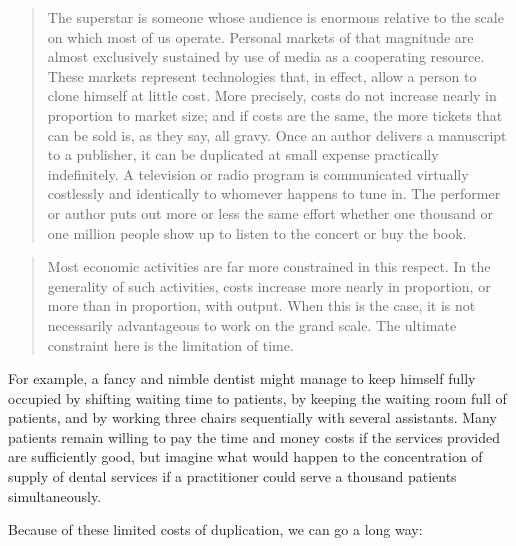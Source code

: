 \documentclass[]{book}
\theoremstyle{definition}
\theoremstyle{definition}
\theoremstyle{definition}
\theoremstyle{remark}
\begin{document}
\begin{quote}
The superstar is someone whose audience is enormous relative to the
scale on which most of us operate. Personal markets of that magnitude
are almost exclusively sustained by use of media as a cooperating
resource. These markets represent technologies that, in effect, allow a
person to clone himself at little cost. More precisely, costs do not
increase nearly in proportion to market size; and if costs are the same,
the more tickets that can be sold is, as they say, all gravy. Once an
author delivers a manuscript to a publisher, it can be duplicated at
small expense practically indefinitely. A television or radio program is
communicated virtually costlessly and identically to whomever happens to
tune in. The performer or author puts out more or less the same effort
whether one thousand or one million people show up to listen to the
concert or buy the book.
\end{quote}

\begin{quote}
Most economic activities are far more constrained in this respect. In
the generality of such activities, costs increase more nearly in
proportion, or more than in proportion, with output. When this is the
case, it is not necessarily advantageous to work on the grand scale. The
ultimate constraint here is the limitation of time.
\end{quote}

For example, a fancy and nimble dentist might manage to keep himself
fully occupied by shifting waiting time to patients, by keeping the
waiting room full of patients, and by working three chairs sequentially
with several assistants. Many patients remain willing to pay the time
and money costs if the services provided are sufficiently good, but
imagine what would happen to the concentration of supply of dental
services if a practitioner could serve a thousand patients
simultaneously.

Because of these limited costs of duplication, we can go a long way:
\end{document}
